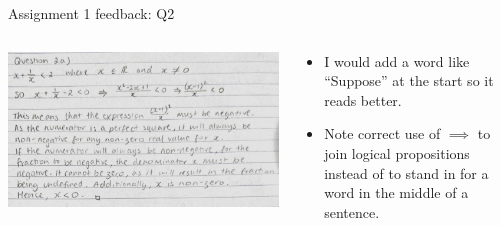 \documentclass[aspectratio=169]{beamer}
\begin{document}
\begin{frame}{Assignment 1 feedback: Q2}
\begin{columns}
\begin{column}{0.65\textwidth}
    \begin{center}
  \includegraphics[width=\textwidth]{Screenshot_20250331_104130}
     \end{center}
\end{column}
\begin{column}{0.35\textwidth}
  \begin{itemize}
    \item I would add a word like ``Suppose'' at the start so it reads better.
    \item Note correct use of $ \implies $ to join logical propositions instead of to stand in for a word in the middle of a sentence.
  \end{itemize}
\end{column}
\end{columns}
\end{frame}
\end{document}
